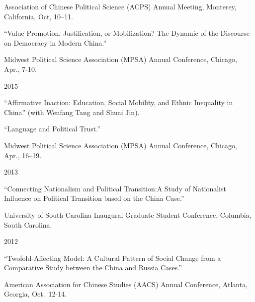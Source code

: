 \documentclass[10.5pt,]{article}
\providecommand{\tightlist}{%
	\setlength{\itemsep}{0pt}\setlength{\parskip}{0pt}}
\renewenvironment{itemize}{
	\begin{list}{}{
			\setlength{\leftmargin}{1.5em}
		}
	}{
	\end{list}
}
\begin{document}
\begin{itemize}
\begin{itemize}
    \begin{itemize}
    \tightlist
    \item
      \footnotesize Association of Chinese Political Science (ACPS)
      Annual Meeting, Monterey, California, Oct, 10--11.
    \end{itemize}
  \item
    ``Value Promotion, Justification, or Mobilization? The Dynamic of
    the Discourse on Democracy in Modern China.''

    \begin{itemize}
    \tightlist
    \item
      \footnotesize Midwest Political Science Association (MPSA) Annual
      Conference, Chicago, Apr., 7-10.
    \end{itemize}
  \end{itemize}
\item
  2015

  \begin{itemize}
  \tightlist
  \item
    ``Affirmative Inaction: Education, Social Mobility, and Ethnic
    Inequality in China'' (with Wenfang Tang and Shuai Jin).
  \item
    ``Language and Political Trust.''

    \begin{itemize}
    \tightlist
    \item
      \footnotesize Midwest Political Science Association (MPSA) Annual
      Conference, Chicago, Apr., 16--19.
    \end{itemize}
  \end{itemize}
\item
  2013

  \begin{itemize}
  \tightlist
  \item
    ``Connecting Nationalism and Political Transition:A Study of
    Nationalist Influence on Political Transition based on the China
    Case.''

    \begin{itemize}
    \tightlist
    \item
      \footnotesize University of South Carolina Inaugural Graduate
      Student Conference, Columbia, South Carolina.
    \end{itemize}
  \end{itemize}
\item
  2012

  \begin{itemize}
  \tightlist
  \item
    ``Twofold-Affecting Model: A Cultural Pattern of Social Change from
    a Comparative Study between the China and Russia Cases.''

    \begin{itemize}
    \tightlist
    \item
      \footnotesize American Association for Chinese Studies (AACS)
      Annual Conference, Atlanta, Georgia, Oct.~12-14.
    \end{itemize}
  \end{itemize}
\end{itemize}
\end{document}
